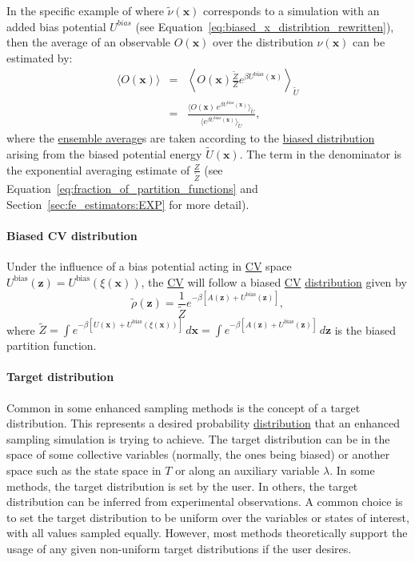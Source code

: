\documentclass[9pt,review]{livecoms}
\newcommand{\vx}{\mathbf{x}}
\newcommand{\vz}{\mathbf{z}}
\begin{document}
In the specific example of where $\tilde \nu(\vx)$ corresponds to a simulation with an added bias potential $U^{bias}$ (see Equation~\ref{eq:biased_x_distribtion_rewritten}), then the average of an observable $O(\vx)$ over the distribution $\nu(\vx)$ can be estimated by:
\begin{eqnarray}
\label{eq:reweighting_bias_potential}
\langle O(\vx) \rangle &=& \left \langle O(\vx) \frac{\tilde{Z}}{Z}e^{\beta U^\mathrm{bias}(\vx)} \right \rangle_{\tilde U} \nonumber  \\
 &=& \frac{\langle O(\vx) \, e^{\beta U^\mathrm{bias}(\vx)} \rangle_{\tilde U}}
{\langle e^{\beta U^\mathrm{bias}(\vx)} \rangle_{\tilde U}},
\end{eqnarray}
where the \hyperlink{ref:ensemble_average} {ensemble average}s are taken according to the \hyperlink{ref:BiasedDist} {biased distribution} arising from the biased potential energy $\tilde U(\vx)$. The term in the denominator is the exponential averaging estimate of $\frac{Z}{\tilde Z}$ (see Equation~\ref{eq:fraction_of_partition_functions} and Section~\ref{sec:fe_estimators:EXP} for more detail).

\hypertarget{ref:BiasedCVDist} {\paragraph{Biased CV distribution}}
Under the influence of a bias potential acting in \hyperlink{ref:CV} {CV} space $U^\mathrm{bias}(\vz)=U^\mathrm{bias}(\xi(\vx))$, the \hyperlink{ref:CV} {CV} will follow a biased \hyperlink{ref:CV} {CV} \hyperlink{ref:Distribution} {distribution} given by
\begin{equation}
\label{eq:BiasedCVDistrib}
\tilde \rho(\vz) = \frac{1}{\tilde{Z}}
e^{-\beta \left[
A(\vz) + U^\mathrm{bias}(\vz)
\right]},
\end{equation}
where $\tilde{Z} = \int e^{-\beta\left [ U(\vx) + U^\mathrm{bias}(\xi(\vx)) \right]} \, d\vx = \int e^{-\beta\left [ A(\vz) + U^\mathrm{bias}(\vz) \right]} \, d\vz$ is the biased partition function.

\hypertarget{ref:targetdist}{\paragraph{Target distribution}}
Common in some enhanced sampling methods is the concept of a target distribution. This represents a desired probability \hyperlink{ref:Distribution} {distribution} that an enhanced sampling simulation is trying to achieve. The target distribution can be in the space of some collective variables (normally, the ones being biased) or another space such as the state space in $T$ or along an auxiliary variable $\lambda$. In some methods, the target distribution is set by the user. In others, the target distribution can be inferred from experimental observations. A common choice is to set the target distribution to be uniform over the variables or states of interest, with all values sampled equally. However, most methods theoretically support the usage of any given non-uniform target distributions if the user desires.
\end{document}
